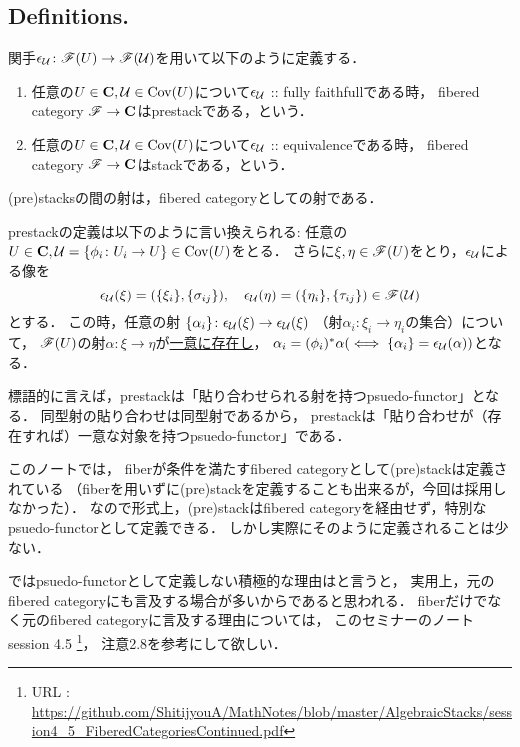 \documentclass[a4paper, dvipdfmx]{jsarticle}
\begin{document}
\subsection{Definitions.}
\begin{Def}
    関手$\epsilon_{\mathcal{U}} \colon \mathscr{F}(U) \to \mathscr{F}(\mathcal{U})$を用いて以下のように定義する．
    \begin{enumerate}[label=(\roman*)]
    \item
        任意の$U \in \mathbf{C}, \mathcal{U} \in \operatorname{Cov}(U)$について$\epsilon_{\mathcal{U}}$ :: fully faithfullである時，
        fibered category $\mathscr{F} \to \mathbf{C}$はprestackである，という．
    \item
        任意の$U \in \mathbf{C}, \mathcal{U} \in \operatorname{Cov}(U)$について$\epsilon_{\mathcal{U}}$ :: equivalenceである時，
        fibered category $\mathscr{F} \to \mathbf{C}$はstackである，という．
    \end{enumerate}

    (pre)stacksの間の射は，fibered categoryとしての射である．
\end{Def}

\begin{Remark}
    prestackの定義は以下のように言い換えられる:
    任意の$U \in \mathbf{C}, \mathcal{U}=\{\phi_i \colon U_i \to U\} \in \operatorname{Cov}(U)$をとる．
    さらに$\xi, \eta \in \mathscr{F}(U)$をとり，$\epsilon_{\mathcal{U}}$による像を
    \[
        \epsilon_{\mathcal{U}}(\xi)=(\{\xi_i\}, \{\sigma_{ij}\}),\quad
        \epsilon_{\mathcal{U}}(\eta)=(\{\eta_i\}, \{\tau_{ij}\})
            \in \mathscr{F}(\mathcal{U}) 
    \]とする．
    この時，任意の射
    $\{\alpha_i\} \colon \epsilon_{\mathcal{U}}(\xi) \to \epsilon_{\mathcal{U}}(\xi)$
    （射$\alpha_i \colon \xi_i \to \eta_i$の集合）について，
    $\mathscr{F}(U)$の射$\alpha \colon \xi \to \eta$が\underline{一意に存在し}，
    $\alpha_i=(\phi_i)^*\alpha (\iff \{\alpha_i\}=\epsilon_{\mathcal{U}}(\alpha))$となる．

    標語的に言えば，prestackは「貼り合わせられる射を持つpsuedo-functor」となる．
    同型射の貼り合わせは同型射であるから，
    prestackは「貼り合わせが（存在すれば）一意な対象を持つpsuedo-functor」である．
\end{Remark}

\begin{Remark}
    このノートでは，
    fiberが条件を満たすfibered categoryとして(pre)stackは定義されている
    （fiberを用いずに(pre)stackを定義することも出来るが，今回は採用しなかった）．
    なので形式上，(pre)stackはfibered categoryを経由せず，特別なpsuedo-functorとして定義できる．
    しかし実際にそのように定義されることは少ない．

    ではpsuedo-functorとして定義しない積極的な理由はと言うと，
    実用上，元のfibered categoryにも言及する場合が多いからであると思われる．
    fiberだけでなく元のfibered categoryに言及する理由については，
    このセミナーのノート session 4.5
    \footnote{URL : \url{https://github.com/ShitijyouA/MathNotes/blob/master/AlgebraicStacks/session4_5_FiberedCategoriesContinued.pdf}}，
    注意2.8を参考にして欲しい．
\end{Remark}
\end{document}
